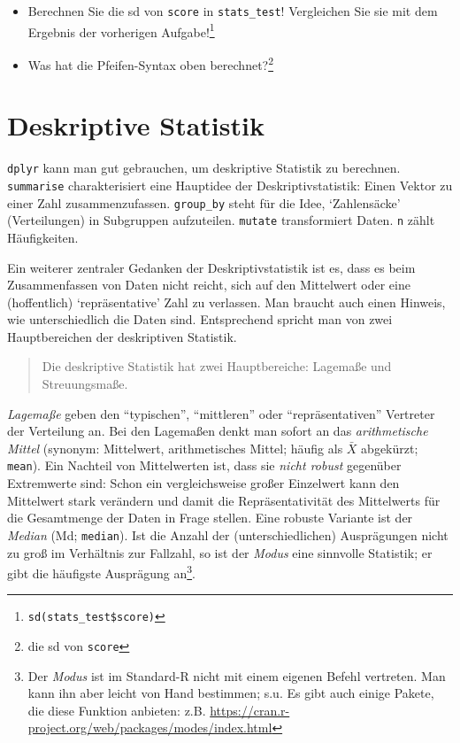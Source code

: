 \documentclass[12pt,ngerman,]{book}
\let\rmarkdownfootnote\footnote%
\def\footnote{\protect\rmarkdownfootnote}
\theoremstyle{definition}
\theoremstyle{definition}
\theoremstyle{remark}
\begin{document}
\begin{itemize}
\item
  Berechnen Sie die sd von \texttt{score} in \texttt{stats\_test}!
  Vergleichen Sie sie mit dem Ergebnis der vorherigen Aufgabe!\footnote{\texttt{sd(stats\_test\$score)}}
\item
  Was hat die Pfeifen-Syntax oben berechnet?\footnote{die sd von
    \texttt{score}}
\end{itemize}

\section{Deskriptive Statistik}\label{deskriptive-statistik}

\texttt{dplyr} kann man gut gebrauchen, um deskriptive Statistik zu
berechnen. \texttt{summarise} charakterisiert eine Hauptidee der
Deskriptivstatistik: Einen Vektor zu einer Zahl zusammenzufassen.
\texttt{group\_by} steht für die Idee, `Zahlensäcke' (Verteilungen) in
Subgruppen aufzuteilen. \texttt{mutate} transformiert Daten. \texttt{n}
zählt Häufigkeiten.

Ein weiterer zentraler Gedanken der Deskriptivstatistik ist es, dass es
beim Zusammenfassen von Daten nicht reicht, sich auf den Mittelwert oder
eine (hoffentlich) `repräsentative' Zahl zu verlassen. Man braucht auch
einen Hinweis, wie unterschiedlich die Daten sind. Entsprechend spricht
man von zwei Hauptbereichen der deskriptiven Statistik.

\begin{quote}
Die deskriptive Statistik hat zwei Hauptbereiche: Lagemaße und
Streuungsmaße.
\end{quote}

\emph{Lagemaße} geben den ``typischen'', ``mittleren'' oder
``repräsentativen'' Vertreter der Verteilung an. Bei den
Lagemaßen denkt man sofort an das \emph{arithmetische
Mittel} (synonym: Mittelwert, arithmetisches Mittel; häufig als
\(\bar{X}\) abgekürzt; \texttt{mean}). Ein Nachteil von Mittelwerten
ist, dass sie \emph{nicht robust} gegenüber Extremwerte sind: Schon ein
vergleichsweise großer Einzelwert kann den Mittelwert stark verändern
und damit die Repräsentativität des Mittelwerts für die Gesamtmenge der
Daten in Frage stellen. Eine robuste Variante ist der \emph{Median} (Md;
\texttt{median}). Ist die Anzahl der (unterschiedlichen) Ausprägungen
nicht zu groß im Verhältnis zur Fallzahl, so ist der \emph{Modus} eine
sinnvolle Statistik; er gibt die häufigste Ausprägung an\footnote{Der
  \emph{Modus} ist im Standard-R nicht mit einem eigenen Befehl
  vertreten. Man kann ihn aber leicht von Hand bestimmen; s.u. Es gibt
  auch einige Pakete, die diese Funktion anbieten: z.B.
  \url{https://cran.r-project.org/web/packages/modes/index.html}}.
\end{document}
